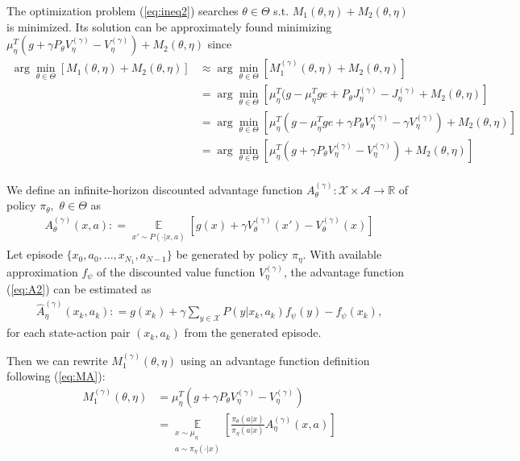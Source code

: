 \documentclass[11pt]{article}
\newcommand{\R}{\mathbb{R}}
\newcommand{\E}{\mathbb{E}}
\newcommand{\X}{\mathcal{X}}
\newcommand{\A}{\mathcal{A}}
\theoremstyle{definition}
\numberwithin{equation}{section}
\begin{document}
The optimization problem (\ref{eq:ineq2}) searches $\theta \in \Theta$  s.t. $M_1(\theta, \eta)+M_2(\theta, \eta)$   is minimized. Its solution can be approximately found minimizing $\mu^T_{\eta}( g   +\gamma P_{\theta}V^{(\gamma)}_{\eta} -   V^{(\gamma)}_{\eta} ) +M_2(\theta, \eta)$ since
\begin{align*}
\arg\min\limits_{\theta\in \Theta} [M_1(\theta, \eta)+M_2(\theta, \eta) ] & \approx \arg\min\limits_{\theta\in \Theta} [M^{(\gamma)}_1(\theta, \eta)+M_2(\theta, \eta) ]  \\
&= \arg\min\limits_{\theta\in \Theta}\left[\mu_{\eta}^T( g - \mu_\eta^T g e + P_{\theta}J^{(\gamma)}_{\eta} - J^{(\gamma)}_{\eta}  +M_2(\theta,  \eta) \right]\\
&= \arg\min\limits_{\theta\in \Theta}\left[\mu_{\eta}^T( g - \mu_\eta^T g e + \gamma P_{\theta} V^{(\gamma)}_{\eta}  - \gamma V^{(\gamma)}_{\eta}  ) +M_2(\theta,  \eta) \right]\\
&= \arg\min\limits_{\theta\in \Theta}\left[\mu_{\eta}^T( g  + \gamma P_{\theta} V^{(\gamma)}_{\eta}  -  V^{(\gamma)}_{\eta}  ) +M_2(\theta,  \eta) \right]\\
\end{align*}



  We define an infinite-horizon discounted advantage function $A_{\theta}^{ (\gamma)}:\X\times \A\rightarrow \R$ of policy $\pi_\theta, $ $\theta\in \Theta$ as 
\begin{align}\label{eq:A2}
	A_{\theta}^{ (\gamma)}(x, a): =   \underset{\substack{ x'\sim P(\cdot|x, a)}  }{\E} \left[g(x) +\gamma V^{(\gamma)}_{\theta}(x') - V^{(\gamma)}_{\theta} (x) \right]                 
\end{align}
Let episode $\{x_0, a_0, ...,x_{N_1} ,a_{N-1}\}$ be generated by policy $\pi_\eta$. With available approximation  $f_\psi$ of the  discounted value function $V^{(\gamma)}_\eta$, the advantage function (\ref{eq:A2}) can be estimated as
 \begin{align}\label{eq:Aes2}
 	\hat A^{(\gamma)}_{\eta}(x_k, a_k): =   g(x_k)  +\gamma \sum\limits_{y\in \X} P(y|x_k, a_k) f_{\psi} (y) -  f_{\psi}(x_k), 
 \end{align}
 for each state-action pair $(x_k, a_k)$ from the generated episode.
 
Then we can rewrite $M_1^{(\gamma)}(\theta, \eta)$ using an advantage function definition following  (\ref{eq:MA}):
\begin{align*}
	M_1^{(\gamma)}(\theta, \eta) & = \mu_{\eta}^T( g + \gamma P_{\theta}V^{(\gamma)}_{\eta} - V^{(\gamma)}_{\eta})\\
	& =  \underset{\substack{ x\sim \mu_{\eta}\\ a\sim \pi_{\eta}(\cdot|x)  }  }{\E}  \left[\frac{\pi_{\theta}(a|x)}{\pi_{\eta}(a|x)}A_{\eta}^{ (\gamma)} (x, a)\right]\\
\end{align*}
\end{document}
